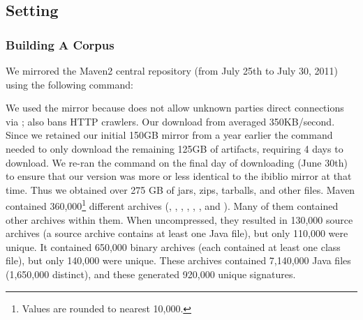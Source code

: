 

\subsection{Setting}


\subsubsection{Building A Corpus}

We mirrored the Maven2 central repository (from July 25th to July 30, 2011) using the
following command:

\hspace{2em} 
\vspace{0.3em}

We used the  mirror because 
does not allow unknown parties direct connections via ;
 also bans HTTP crawlers.
Our download from  averaged 350KB/second.
Since we retained our initial 150GB mirror from a year earlier
the  command needed to only download the remaining 125GB
of artifacts, requiring 4 days to download.  We re-ran the  command
on the final day of downloading (June 30th)
to ensure that our version was more or less identical to the ibiblio
mirror at that time.
Thus we obtained over 275 GB of jars, zips, tarballs, and other files.
Maven contained 360,000\footnote{Values are rounded to nearest 10,000.}   
different archives (, , , ,
, , and ). Many of them contained other
archives within them.  When uncompressed, they resulted in 130,000
source archives (a source archive contains at least one Java file), but
only 110,000 
were unique.  It contained 650,000                                    
binary archives (each contained at least one class file), but only 140,000
were unique.  These archives contained 7,140,000
Java files (1,650,000                                                 
distinct), and these generated 920,000 unique signatures.                 

